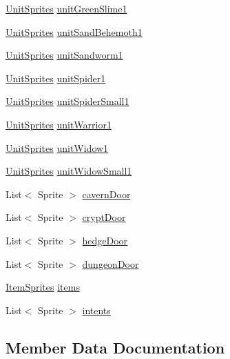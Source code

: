 \begin{DoxyCompactItemize}
\mbox{\hyperlink{class_unit_sprites}{Unit\+Sprites}} \mbox{\hyperlink{class_sprite_manager_a799b3283c6b93c9c395deba3390bcd87}{unit\+Green\+Slime1}}
\item 
\mbox{\hyperlink{class_unit_sprites}{Unit\+Sprites}} \mbox{\hyperlink{class_sprite_manager_af74d4c124738af254d099adae12a920c}{unit\+Sand\+Behemoth1}}
\item 
\mbox{\hyperlink{class_unit_sprites}{Unit\+Sprites}} \mbox{\hyperlink{class_sprite_manager_af6b6092b09e977440c9c301fcce90a9c}{unit\+Sandworm1}}
\item 
\mbox{\hyperlink{class_unit_sprites}{Unit\+Sprites}} \mbox{\hyperlink{class_sprite_manager_aabe45582c52f2f33409eddd3d74e95aa}{unit\+Spider1}}
\item 
\mbox{\hyperlink{class_unit_sprites}{Unit\+Sprites}} \mbox{\hyperlink{class_sprite_manager_abcfa64673eda733ff5a0791fca6774ef}{unit\+Spider\+Small1}}
\item 
\mbox{\hyperlink{class_unit_sprites}{Unit\+Sprites}} \mbox{\hyperlink{class_sprite_manager_a468d21273b76232a3c46e4806526191b}{unit\+Warrior1}}
\item 
\mbox{\hyperlink{class_unit_sprites}{Unit\+Sprites}} \mbox{\hyperlink{class_sprite_manager_a2de0703584ff32d531f6abeddd2ab249}{unit\+Widow1}}
\item 
\mbox{\hyperlink{class_unit_sprites}{Unit\+Sprites}} \mbox{\hyperlink{class_sprite_manager_af903c428c3cef263662f32fe5e183b6f}{unit\+Widow\+Small1}}
\item 
List$<$ Sprite $>$ \mbox{\hyperlink{class_sprite_manager_a0efbce48d098c815aa4706800aab65cc}{cavern\+Door}}
\item 
List$<$ Sprite $>$ \mbox{\hyperlink{class_sprite_manager_a534759a1cd37b734b35d39009c05433a}{crypt\+Door}}
\item 
List$<$ Sprite $>$ \mbox{\hyperlink{class_sprite_manager_ae9ce272224734b0bbeee411220ee61a9}{hedge\+Door}}
\item 
List$<$ Sprite $>$ \mbox{\hyperlink{class_sprite_manager_aa8fb324d0bd5bafec97e314f07322f52}{dungeon\+Door}}
\item 
\mbox{\hyperlink{class_item_sprites}{Item\+Sprites}} \mbox{\hyperlink{class_sprite_manager_a9ff4e140b84b106de6f88d7b97d61483}{items}}
\item 
List$<$ Sprite $>$ \mbox{\hyperlink{class_sprite_manager_aa89806bcec93d42c07a903b9739adf4f}{intents}}
\end{DoxyCompactItemize}


\subsection{Member Data Documentation}
\mbox{\label{class_sprite_manager_a59bc7917142934092c7b3888451dd9e4}} 
